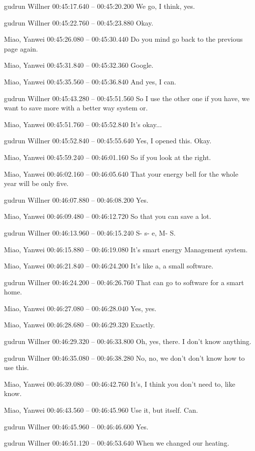 {gudrun Willner 00:45:17.640 -- 00:45:20.200
We go, I think, yes.

gudrun Willner 00:45:22.760 -- 00:45:23.880
Okay.

Miao, Yanwei 00:45:26.080 -- 00:45:30.440
Do you mind go back to the previous page again.

Miao, Yanwei 00:45:31.840 -- 00:45:32.360
Google.

Miao, Yanwei 00:45:35.560 -- 00:45:36.840
And yes, I can.

gudrun Willner 00:45:43.280 -- 00:45:51.560
So I use the other one if you have, we want to save more with a better way system or.

Miao, Yanwei 00:45:51.760 -- 00:45:52.840
It's okay...

gudrun Willner 00:45:52.840 -- 00:45:55.640
Yes, I opened this. Okay.

Miao, Yanwei 00:45:59.240 -- 00:46:01.160
So if you look at the right.

Miao, Yanwei 00:46:02.160 -- 00:46:05.640
That your energy bell for the whole year will be only five.

gudrun Willner 00:46:07.880 -- 00:46:08.200
Yes.

Miao, Yanwei 00:46:09.480 -- 00:46:12.720
So that you can save a lot.

gudrun Willner 00:46:13.960 -- 00:46:15.240
S- s- e, M- S.

Miao, Yanwei 00:46:15.880 -- 00:46:19.080
It's smart energy Management system.

Miao, Yanwei 00:46:21.840 -- 00:46:24.200
It's like a, a small software.

gudrun Willner 00:46:24.200 -- 00:46:26.760
That can go to software for a smart home.

Miao, Yanwei 00:46:27.080 -- 00:46:28.040
Yes, yes.

Miao, Yanwei 00:46:28.680 -- 00:46:29.320
Exactly.

gudrun Willner 00:46:29.320 -- 00:46:33.800
Oh, yes, there. I don't know anything.

gudrun Willner 00:46:35.080 -- 00:46:38.280
No, no, we don't don't know how to use this.

Miao, Yanwei 00:46:39.080 -- 00:46:42.760
It's, I think you don't need to, like know.

Miao, Yanwei 00:46:43.560 -- 00:46:45.960
Use it, but itself. Can.

gudrun Willner 00:46:45.960 -- 00:46:46.600
Yes.

gudrun Willner 00:46:51.120 -- 00:46:53.640
When we changed our heating.

}
